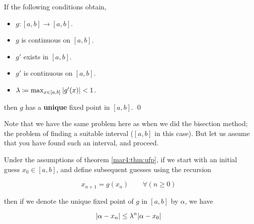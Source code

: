 \begin{thm}
  \label{mar4:thm:ufp}
  \hfill
  
  If the following conditions obtain,
  \begin{itemize}
  \item
    $g \colon [a, b] \to [a, b]$.

  \item
    $g$ is continuous on $[a, b]$.

  \item
    $g'$ exists in $[a, b]$.

  \item
    $g'$ is continuous on $[a, b]$.

  \item
    $\lambda \coloneqq \max_{x \in [a, b]} \abs{g'(x)} < 1$.

  \end{itemize}
  then $g$ has a \textbf{unique} fixed point in $[a, b]$.
  \hfill\qed
\end{thm}
Note that we have the same problem here as when we did the bisection method; the problem of finding a suitable interval ($[a, b]$ in this case). But let us assume that you have found such an interval, and proceed.

Under the assumptions of theorem \ref{mar4:thm:ufp}, if we start with an initial guess $x_0 \in [a, b]$, and define subsequent guesses using the recursion
\begin{defn}
  \label{mar4:def:iter}
  \[
    x_{n+1} = g(x_n) \qquad \forall(n \geq 0)
  \]
\end{defn}
then if we denote the unique fixed point of $g$ in $[a, b]$ by $\alpha$, we have
\begin{thm}
  \label{mar4:thm:2c}
  \[
    \abs{\alpha - x_n} \leq \lambda^n\abs{\alpha - x_0}
  \]
\end{thm}

